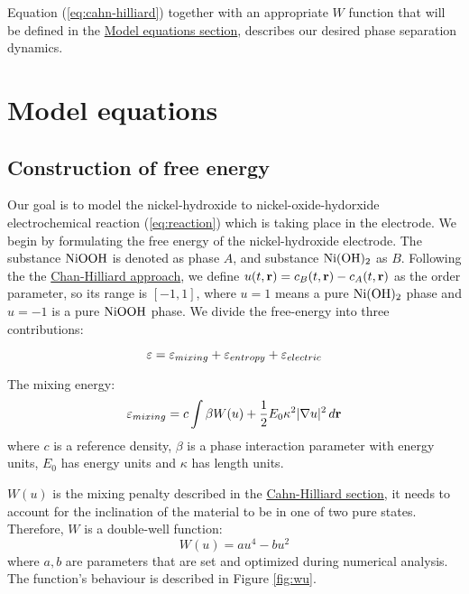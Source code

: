 \documentclass[12pt]{article}
\begin{document}
Equation (\ref{eq:cahn-hilliard}) together with an appropriate $W$ function that will be defined in the  \hyperref[sec:model-equations]{Model equations section}, describes our desired phase separation dynamics.


\pagebreak
\section{Model equations} \label{sec:model-equations}

\subsection{Construction of free energy}
Our goal is to model the nickel-hydroxide to nickel-oxide-hydorxide electrochemical reaction (\ref{eq:reaction}) which is taking place in the electrode. We begin by formulating the free energy of the nickel-hydroxide electrode. The substance $\ce{NiOOH}$ is denoted as phase $A$, and substance $\ce{Ni(OH)_2}$ as $B$. Following the the \hyperref[sec:Cahn-Hilliard]{Chan-Hilliard approach}, we define $u(t, {\bf r})=c_B(t, {\bf r})-c_A(t, {\bf r})$ as the order parameter, so its range is $[-1,1]$, where $u=1$ means a pure $\ce{Ni(OH)_2}$ phase and $u=-1$ is a pure $\ce{NiOOH}$ phase.
We divide the free-energy into three contributions:

\begin{equation}
    \large \varepsilon = \varepsilon_{mixing} + \varepsilon_{entropy} + \varepsilon_{electric}
\end{equation}

The mixing energy:
\begin{equation}
     \varepsilon_{mixing} = c\int \beta W(u) + \frac{1}{2} E_0 \kappa^2 |\nabla u|^2 \, d{\bf r}
\end{equation}
where $c$ is a reference density, $\beta$ is a phase interaction parameter with energy units, $E_0$ has energy units and $\kappa$ has length units. 

$W(u)$ is the mixing penalty described in the \hyperref[sec:Cahn-Hilliard]{Cahn-Hilliard section}, it needs to account for the inclination of the material to be in one of two pure states. Therefore, $W$ is a double-well function:
\begin{equation} \label{eq:wu}
    W(u) = au^4 - bu^2
\end{equation}
where $a, b$ are parameters that are set and optimized during numerical analysis. The function's behaviour is described in Figure \ref{fig:wu}. 
\end{document}
